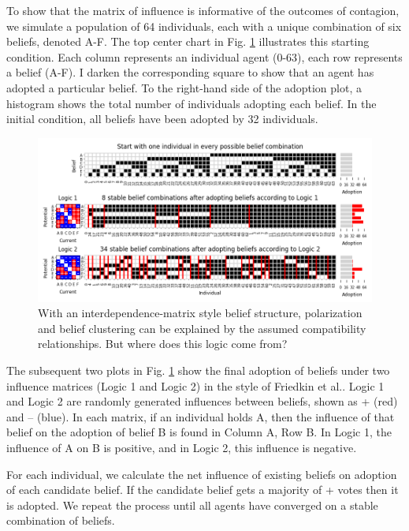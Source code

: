 \documentclass{article}
\begin{document}
To show that the matrix of influence is informative of the outcomes of contagion, we simulate a population of 64 individuals, each with a unique combination of six beliefs, denoted A-F. The top center chart in Fig. \ref{fig:rule_matrix} illustrates this starting condition. Each column represents an individual agent (0-63), each row represents a belief (A-F). I darken the corresponding square to show that an agent has adopted a particular belief. To the right-hand side of the adoption plot, a histogram shows the total number of individuals adopting each belief. In the initial condition, all beliefs have been adopted by 32 individuals.

\begin{figure}[h!]
\centering
\includegraphics[width=1.0\columnwidth]{rule interdependence matrix.png}
\caption{With an interdependence-matrix style belief structure, polarization and belief clustering can be explained by the assumed compatibility relationships. But where does this logic come from?}
\label{fig:rule_matrix}
\end{figure}

The subsequent two plots in Fig. \ref{fig:rule_matrix} show the final adoption of beliefs under two influence matrices (Logic 1 and Logic 2) in the style of Friedkin et al.\cite{friedkin2016network}. Logic 1 and Logic 2  are randomly generated influences between beliefs, shown as + (red) and – (blue). In each matrix, if an individual holds A, then the influence of that belief on the adoption of belief B is found in Column A, Row B. In Logic 1, the influence of A on B is positive, and in Logic 2, this influence is negative. 

For each individual, we calculate the net influence of existing beliefs on adoption of each candidate belief. If the candidate belief gets a majority of + votes then it is adopted. We repeat the process until all agents have converged on a stable combination of beliefs. 
\end{document}
